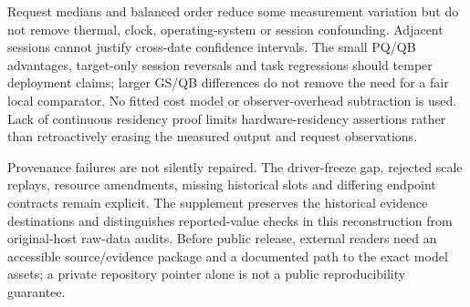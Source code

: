 Request medians and balanced order reduce some measurement variation but do not remove thermal, clock, operating-system or session confounding. Adjacent sessions cannot justify cross-date confidence intervals. The small PQ/QB advantages, target-only session reversals and task regressions should temper deployment claims; larger GS/QB differences do not remove the need for a fair local comparator. No fitted cost model or observer-overhead subtraction is used. Lack of continuous residency proof limits hardware-residency assertions rather than retroactively erasing the measured output and request observations.

Provenance failures are not silently repaired. The driver-freeze gap, rejected scale replays, resource amendments, missing historical slots and differing endpoint contracts remain explicit. The supplement preserves the historical evidence destinations and distinguishes reported-value checks in this reconstruction from original-host raw-data audits. Before public release, external readers need an accessible source/evidence package and a documented path to the exact model assets; a private repository pointer alone is not a public reproducibility guarantee.
